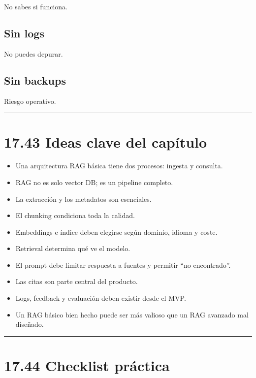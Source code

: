 No sabes si funciona.

\subsection{Sin logs}\label{sin-logs}

No puedes depurar.

\subsection{Sin backups}\label{sin-backups}

Riesgo operativo.

\begin{center}\rule{0.5\linewidth}{0.5pt}\end{center}

\section{17.43 Ideas clave del
capítulo}\label{ideas-clave-del-capuxedtulo-16}

\begin{itemize}
\tightlist
\item
  Una arquitectura RAG básica tiene dos procesos: ingesta y consulta.
\item
  RAG no es solo vector DB; es un pipeline completo.
\item
  La extracción y los metadatos son esenciales.
\item
  El chunking condiciona toda la calidad.
\item
  Embeddings e índice deben elegirse según dominio, idioma y coste.
\item
  Retrieval determina qué ve el modelo.
\item
  El prompt debe limitar respuesta a fuentes y permitir ``no
  encontrado''.
\item
  Las citas son parte central del producto.
\item
  Logs, feedback y evaluación deben existir desde el MVP.
\item
  Un RAG básico bien hecho puede ser más valioso que un RAG avanzado mal
  diseñado.
\end{itemize}

\begin{center}\rule{0.5\linewidth}{0.5pt}\end{center}

\section{17.44 Checklist práctica}\label{checklist-pruxe1ctica-16}

